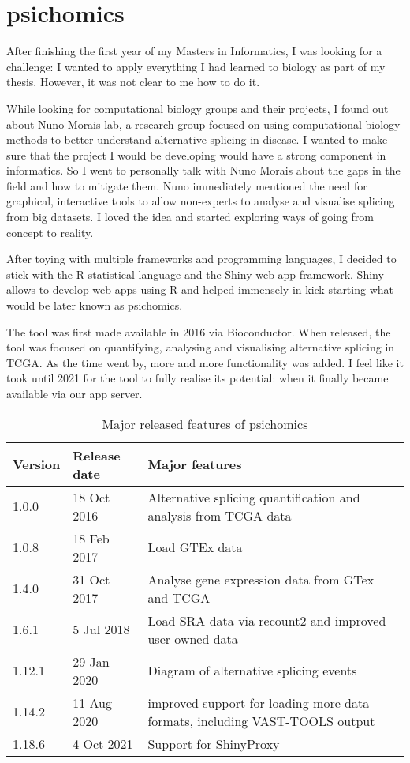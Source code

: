 \chapter{psichomics}

After finishing the first year of my Masters in Informatics, I was looking for a challenge: I wanted to apply everything I had learned to biology as part of my thesis. However, it was not clear to me how to do it.

While looking for computational biology groups and their projects, I found out about Nuno Morais lab, a research group focused on using computational biology methods to better understand alternative splicing in disease. I wanted to make sure that the project I would be developing would have a strong component in informatics. So I went to personally talk with Nuno Morais about the gaps in the field and how to mitigate them. Nuno immediately mentioned the need for graphical, interactive tools to allow non-experts to analyse and visualise splicing from big datasets. I loved the idea and started exploring ways of going from concept to reality.

After toying with multiple frameworks and programming languages, I decided to stick with the R statistical language and the Shiny web app framework. Shiny allows to develop web apps using R and helped immensely in kick-starting what would be later known as psichomics.

The tool was first made available in 2016 via Bioconductor. When released, the tool was focused on quantifying, analysing and visualising alternative splicing in TCGA. As the time went by, more and more functionality was added. I feel like it took until 2021 for the tool to fully realise its potential: when it finally became available via our app server.

\begin{table}
\caption{Major released features of psichomics}
\label{tab:psichomics}
\begin{tabularx}{\textwidth}{ l l X }
\toprule
\textbf{Version} & \textbf{Release date} & \textbf{Major features} \\
\midrule
1.0.0  & 18 Oct 2016 & Alternative splicing quantification and analysis from TCGA data \\
1.0.8  & 18 Feb 2017 & Load GTEx data \\
1.4.0  & 31 Oct 2017 & Analyse gene expression data from GTex and TCGA \\
1.6.1  & 5 Jul 2018  & Load SRA data via recount2 and improved user-owned data \\
1.12.1 & 29 Jan 2020 & Diagram of alternative splicing events \\
1.14.2 & 11 Aug 2020 & improved support for loading more data formats, including VAST-TOOLS output \\
1.18.6 & 4 Oct 2021  & Support for ShinyProxy \\                                                  
\bottomrule
\end{tabularx}
\end{table}

